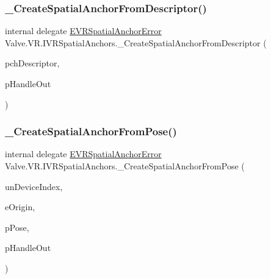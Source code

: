 \subsubsection{\texorpdfstring{\_CreateSpatialAnchorFromDescriptor()}{\_CreateSpatialAnchorFromDescriptor()}}
{\footnotesize\ttfamily internal delegate \mbox{\hyperlink{namespace_valve_1_1_v_r_ab0aeb9b02c0851286deb0b4134b220d4}{E\+V\+R\+Spatial\+Anchor\+Error}} Valve.\+V\+R.\+I\+V\+R\+Spatial\+Anchors.\+\_\+\+Create\+Spatial\+Anchor\+From\+Descriptor (\begin{DoxyParamCaption}\item[{string}]{pch\+Descriptor,  }\item[{ref uint}]{p\+Handle\+Out }\end{DoxyParamCaption})}

\mbox{\label{struct_valve_1_1_v_r_1_1_i_v_r_spatial_anchors_a62e9fc61756a4d44558e01efefa17330}} 
\subsubsection{\texorpdfstring{\_CreateSpatialAnchorFromPose()}{\_CreateSpatialAnchorFromPose()}}
{\footnotesize\ttfamily internal delegate \mbox{\hyperlink{namespace_valve_1_1_v_r_ab0aeb9b02c0851286deb0b4134b220d4}{E\+V\+R\+Spatial\+Anchor\+Error}} Valve.\+V\+R.\+I\+V\+R\+Spatial\+Anchors.\+\_\+\+Create\+Spatial\+Anchor\+From\+Pose (\begin{DoxyParamCaption}\item[{uint}]{un\+Device\+Index,  }\item[{\mbox{\hyperlink{namespace_valve_1_1_v_r_a29be99a3c2f780157bd490db06a7f12f}{E\+Tracking\+Universe\+Origin}}}]{e\+Origin,  }\item[{ref \mbox{\hyperlink{struct_valve_1_1_v_r_1_1_spatial_anchor_pose__t}{Spatial\+Anchor\+Pose\+\_\+t}}}]{p\+Pose,  }\item[{ref uint}]{p\+Handle\+Out }\end{DoxyParamCaption})}

\mbox{\label{struct_valve_1_1_v_r_1_1_i_v_r_spatial_anchors_aaf6ca9028d56903fe2a6ef154ae4dcab}} 
